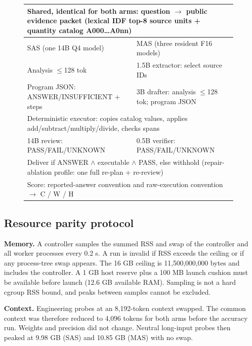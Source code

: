 \documentclass[letterpaper]{article}
\begin{document}
\begin{figure}[tbp]
\centering
\begin{tabular}{p{238pt}p{238pt}}
\multicolumn{2}{p{488pt}}{\centering Shared, identical for both arms: question $\rightarrow$ public evidence packet (lexical IDF top-8 source units + quantity catalog A000\ldots A0nn)} \\
\midrule
SAS (one 14B Q4 model) & MAS (three resident F16 models) \\
\midrule
Analysis $\leq$128 tok & 1.5B extractor: select source IDs \\
Program JSON: ANSWER/INSUFFICIENT + steps & 3B drafter: analysis $\leq$128 tok; program JSON \\
\midrule
\multicolumn{2}{p{488pt}}{\centering Deterministic executor: copies catalog values, applies add/subtract/multiply/divide, checks spans} \\
\midrule
14B review: PASS/FAIL/UNKNOWN & 0.5B verifier: PASS/FAIL/UNKNOWN \\
\midrule
\multicolumn{2}{p{488pt}}{\centering Deliver if ANSWER $\wedge$ executable $\wedge$ PASS, else withhold (repair-ablation profile: one full re-plan + re-review)} \\
\midrule
\multicolumn{2}{p{488pt}}{\centering Score: reported-answer convention and raw-execution convention $\rightarrow$ C / W / H} \\
\end{tabular}
\end{figure}

\subsection{Resource parity protocol}\label{resource-parity-protocol}

\textbf{Memory.} A controller samples the summed RSS and swap of the controller and all worker processes every 0.2 s. A run is invalid if RSS exceeds the ceiling or if any process-tree swap appears. The 16 GB ceiling is 11,500,000,000 bytes and includes the controller. A 1 GB host reserve plus a 100 MB launch cushion must be available before launch (12.6 GB available RAM). Sampling is not a hard cgroup RSS bound, and peaks between samples cannot be excluded.

\textbf{Context.} Engineering probes at an 8,192-token context swapped. The common context was therefore reduced to 4,096 tokens for both arms before the accuracy run. Weights and precision did not change. Neutral long-input probes then peaked at 9.98 GB (SAS) and 10.85 GB (MAS) with no swap.
\end{document}
